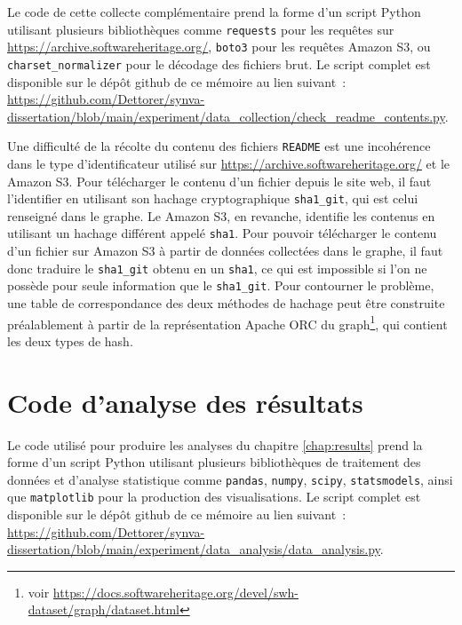 Le code de cette collecte complémentaire prend la forme d'un script Python utilisant plusieurs bibliothèques
comme \texttt{requests} pour les requêtes sur \url{https://archive.softwareheritage.org/}, \texttt{boto3} pour
les requêtes Amazon S3, ou \texttt{charset\_normalizer} pour le décodage des fichiers brut. Le script complet
est disponible sur le dépôt \gls{github} de ce mémoire au lien suivant :
\url{https://github.com/Dettorer/synva-dissertation/blob/main/experiment/data_collection/check_readme_contents.py}.

Une difficulté de la récolte du contenu des fichiers \texttt{README} est une incohérence dans le type
d'identificateur utilisé sur \url{https://archive.softwareheritage.org/} et le  Amazon S3. Pour
télécharger le contenu d'un fichier depuis le site web, il faut l'identifier en utilisant son hachage
cryptographique \texttt{sha1\_git}, qui est celui renseigné dans le graphe. Le  Amazon S3, en
revanche, identifie les contenus en utilisant un hachage différent appelé \texttt{sha1}. Pour pouvoir
télécharger le contenu d'un fichier sur Amazon S3 à partir de données collectées dans le graphe, il faut donc
traduire le \texttt{sha1\_git} obtenu en un \texttt{sha1}, ce qui est impossible si l'on ne possède pour seule
information que le \texttt{sha1\_git}. Pour contourner le problème, une table de correspondance des deux
méthodes de hachage peut être construite préalablement à partir de la représentation Apache ORC du
graph\footnote{voir \url{https://docs.softwareheritage.org/devel/swh-dataset/graph/dataset.html}}, qui
contient les deux types de hash.

\section{Code d'analyse des résultats}
\label{app:analysis.py}

Le code utilisé pour produire les analyses du chapitre \ref{chap:results} prend la forme d'un script Python
utilisant plusieurs bibliothèques de traitement des données et d'analyse statistique comme \texttt{pandas},
\texttt{numpy}, \texttt{scipy}, \texttt{statsmodels}, ainsi que \texttt{matplotlib} pour la production des
visualisations. Le script complet est disponible sur le dépôt \gls{github} de ce mémoire au lien suivant :
\url{https://github.com/Dettorer/synva-dissertation/blob/main/experiment/data_analysis/data_analysis.py}.

